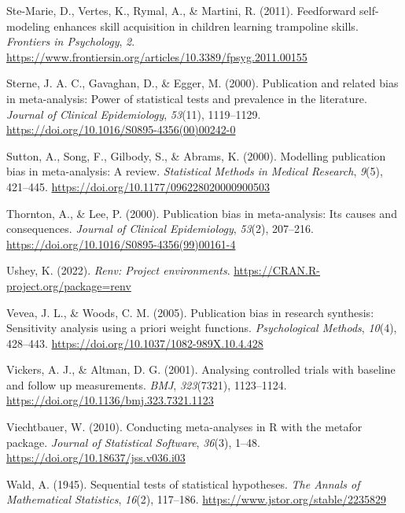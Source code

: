 \documentclass[
  doc, donotrepeattitle,floatsintext]{apa7}
\newlength{\cslhangindent}
\newlength{\cslentryspacingunit} %
\newenvironment{CSLReferences}[2] %
 {%
  \setlength{\parindent}{0pt}
  \ifodd #1
  \let\oldpar\par
  \def\par{\hangindent=\cslhangindent\oldpar}
  \fi
  \setlength{\parskip}{#2\cslentryspacingunit}
 }%
 {}
\begin{document}
\begin{CSLReferences}{1}{0}
\leavevmode{}%
Ste-Marie, D., Vertes, K., Rymal, A., \& Martini, R. (2011). Feedforward self-modeling enhances skill acquisition in children learning trampoline skills. \emph{Frontiers in Psychology}, \emph{2}. \url{https://www.frontiersin.org/articles/10.3389/fpsyg.2011.00155}

\leavevmode{}%
Sterne, J. A. C., Gavaghan, D., \& Egger, M. (2000). Publication and related bias in meta-analysis: Power of statistical tests and prevalence in the literature. \emph{Journal of Clinical Epidemiology}, \emph{53}(11), 1119--1129. \url{https://doi.org/10.1016/S0895-4356(00)00242-0}

\leavevmode{}%
Sutton, A., Song, F., Gilbody, S., \& Abrams, K. (2000). Modelling publication bias in meta-analysis: A review. \emph{Statistical Methods in Medical Research}, \emph{9}(5), 421--445. \url{https://doi.org/10.1177/096228020000900503}

\leavevmode{}%
Thornton, A., \& Lee, P. (2000). Publication bias in meta-analysis: Its causes and consequences. \emph{Journal of Clinical Epidemiology}, \emph{53}(2), 207--216. \url{https://doi.org/10.1016/S0895-4356(99)00161-4}

\leavevmode{}%
Ushey, K. (2022). \emph{Renv: Project environments}. \url{https://CRAN.R-project.org/package=renv}

\leavevmode{}%
Vevea, J. L., \& Woods, C. M. (2005). Publication bias in research synthesis: Sensitivity analysis using a priori weight functions. \emph{Psychological Methods}, \emph{10}(4), 428--443. \url{https://doi.org/10.1037/1082-989X.10.4.428}

\leavevmode{}%
Vickers, A. J., \& Altman, D. G. (2001). Analysing controlled trials with baseline and follow up measurements. \emph{BMJ}, \emph{323}(7321), 1123--1124. \url{https://doi.org/10.1136/bmj.323.7321.1123}

\leavevmode{}%
Viechtbauer, W. (2010). Conducting meta-analyses in {R} with the {metafor} package. \emph{Journal of Statistical Software}, \emph{36}(3), 1--48. \url{https://doi.org/10.18637/jss.v036.i03}

\leavevmode{}%
Wald, A. (1945). Sequential tests of statistical hypotheses. \emph{The Annals of Mathematical Statistics}, \emph{16}(2), 117--186. \url{https://www.jstor.org/stable/2235829}


\end{CSLReferences}
\end{document}
